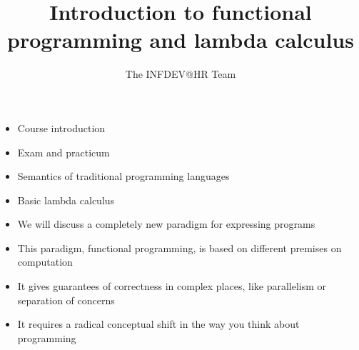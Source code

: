 \documentclass{beamer}
\title{Introduction to functional programming and lambda calculus}
\author{The INFDEV@HR Team}
\institute{Hogeschool Rotterdam \\ 
Rotterdam, Netherlands}
\date{}
\begin{document}
\maketitle
{}
\begin{frame}[fragile]{\CurrentSection}
\begin{block}{\CurrentSubSection}
\begin{itemize}
\item Course introduction
\item Exam and practicum
\item Semantics of traditional programming languages
\item Basic lambda calculus

\end{itemize}

\end{block}


\end{frame}

\begin{frame}[fragile]{\CurrentSection}
\begin{block}{\CurrentSubSection}
\begin{itemize}
\item We will discuss a completely new paradigm for expressing programs
\item This paradigm, functional programming, is based on different premises on computation
\item It gives guarantees of correctness in complex places, like parallelism or separation of concerns
\item It requires a radical conceptual shift in the way you think about programming

\end{itemize}

\end{block}


\end{frame}
\end{document}
